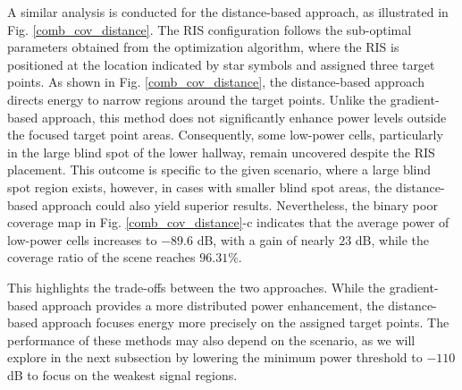 \documentclass{IEEEoj}
\begin{document}
A similar analysis is conducted for the distance-based approach, as illustrated in Fig. \ref{comb_cov_distance}. The RIS configuration follows the sub-optimal parameters obtained from the optimization algorithm, where the RIS is positioned at the location indicated by star symbols and assigned three target points. As shown in Fig. \ref{comb_cov_distance}, the distance-based approach directs energy to narrow regions around the target points. Unlike the gradient-based approach, this method does not significantly enhance power levels outside the focused target point areas. Consequently, some low-power cells, particularly in the large blind spot of the lower hallway, remain uncovered despite the RIS placement. This outcome is specific to the given scenario, where a large blind spot region exists, however, in cases with smaller blind spot areas, the distance-based approach could also yield superior results. Nevertheless, the binary poor coverage map in Fig. \ref{comb_cov_distance}-c indicates that the average power of low-power cells increases to $-89.6$ dB, with a gain of nearly $23$ dB, while the coverage ratio of the scene reaches $96.31\%$.

This highlights the trade-offs between the two approaches. While the gradient-based approach provides a more distributed power enhancement, the distance-based approach focuses energy more precisely on the assigned target points. The performance of these methods may also depend on the scenario, as we will explore in the next subsection by lowering the minimum power threshold to $-110$ dB to focus on the weakest signal regions.
\end{document}
